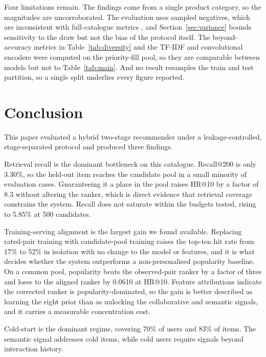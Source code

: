 \documentclass[10pt,twocolumn]{article}
\begin{document}
Four limitations remain. The findings come from a single product category, so
the magnitudes are uncorroborated. The evaluation uses sampled negatives,
which are inconsistent with full-catalogue metrics
\citep{krichene2020sampled}, and Section~\ref{sec:variance} bounds sensitivity
to the draw but not the bias of the protocol itself. The beyond-accuracy
metrics in Table~\ref{tab:diversity} and the TF-IDF and convolutional
encoders were computed on the priority-fill pool, so they are comparable
between models but not to Table~\ref{tab:main}. And no result resamples the
train and test partition, so a single split underlies every figure reported.

\section{Conclusion}
\label{sec:conclusion}

This paper evaluated a hybrid two-stage recommender under a
leakage-controlled, stage-separated protocol and produced three findings.

Retrieval recall is the dominant bottleneck on this catalogue. Recall@200 is
only 3.30\%, so the held-out item reaches the candidate pool in a small
minority of evaluation cases. Guaranteeing it a place in the pool raises HR@10
by a factor of 8.3 without altering the ranker, which is direct evidence that
retrieval coverage constrains the system. Recall does not saturate within the
budgets tested, rising to 5.85\% at 500 candidates.

Training-serving alignment is the largest gain we found available. Replacing
rated-pair training with candidate-pool training raises the top-ten hit rate
from 17\% to 52\% in isolation with no change to the model or features, and it
is what decides whether the system outperforms a non-personalised popularity
baseline. On a common pool, popularity beats the observed-pair ranker by a
factor of three and loses to the aligned ranker by 0.0610 at HR@10. Feature
attributions indicate the corrected ranker is popularity-dominated, so the
gain is better described as learning the right prior than as unlocking the
collaborative and semantic signals, and it carries a measurable concentration
cost.

Cold-start is the dominant regime, covering 70\% of users and 83\% of items.
The semantic signal addresses cold items, while cold users require signals
beyond interaction history.
\end{document}
